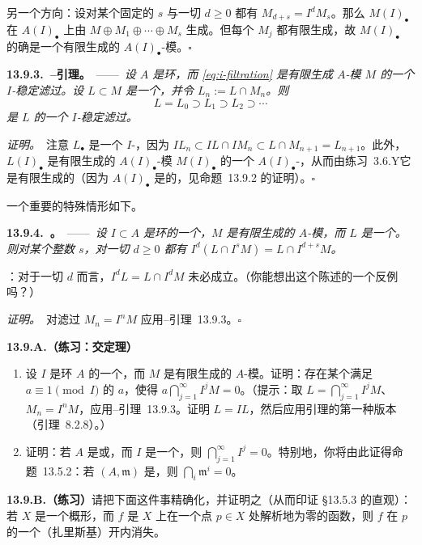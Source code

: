 另一个方向：设对某个固定的 $s$ 与一切 $d\ge0$ 都有 $M_{d+s}=I^dM_s$。那么 $M(I)_\bullet$ 在 $A(I)_\bullet$ 上由 $M\oplus M_1\oplus\cdots\oplus M_s$ 生成。但每个 $M_j$ 都有限生成，故 $M(I)_\bullet$ 的确是一个有限生成的 $A(I)_\bullet$-模。\hfill$\square$

\textbf{13.9.3.\ \trArtin--\trRees{}引理。}\ ——\ \emph{设 $A$ 是\trNoetherian{}环，而 \eqref{eq:i-filtration} 是有限生成 $A$-模 $M$ 的一个 $I$-稳定滤过。设 $L\subset M$ 是一个\trSubmodule，并令 $L_n:=L\cap M_n$。则}
\[
L=L_0\supset L_1\supset L_2\supset\cdots
\]
\emph{是 $L$ 的一个 $I$-稳定滤过。}

\emph{证明。}\ 注意 $L_\bullet$ 是一个 $I$-\trFiltration，因为 $IL_n\subset IL\cap IM_n\subset L\cap M_{n+1}=L_{n+1}$。此外，$L(I)_\bullet$ 是有限生成的 $A(I)_\bullet$-模 $M(I)_\bullet$ 的一个 $A(I)_\bullet$-\trSubmodule，从而由\mbox{练习~3.6.Y}它是有限生成的（因为 $A(I)_\bullet$ 是\trNoetherian{}的，见命题~13.9.2 的证明）。\hfill$\square$

一个重要的特殊情形如下。

\textbf{13.9.4.\ \trhCorollary{}。}\ ——\ \emph{设 $I\subset A$ 是\trNoetherian{}环的一个\trIdeal，$M$ 是有限生成的 $A$-模，而 $L$ 是一个\trSubmodule。则对某个整数 $s$，对一切 $d\ge0$ 都有 $I^d(L\cap I^sM)=L\cap I^{d+s}M$。}

\trhWarning{}：对于一切 $d$ 而言，$I^dL=L\cap I^dM$ 未必成立。（你能想出这个陈述的一个反例吗？）

\emph{证明。}\ 对滤过 $M_n=I^nM$ 应用\trArtin--\trRees{}引理~13.9.3。\hfill$\square$

\textbf{13.9.A.（练习：\trKrull{}交定理）}\quad
\begin{enumerate}[label=(\alph*)]
\item 设 $I$ 是\trNoetherian{}环 $A$ 的一个\trIdeal，而 $M$ 是有限生成的 $A$-模。证明：存在某个满足 $a\equiv1\pmod{I}$ 的 $a$，使得 $a\bigcap_{j=1}^{\infty}I^jM=0$。（提示：取 $L=\bigcap_{j=1}^{\infty}I^jM$、$M_n=I^nM$，应用\trArtin--\trRees{}引理~13.9.3。证明 $L=IL$，然后应用\trNakayama{}引理的第一种版本（引理~8.2.8）。）
\item 证明：若 $A$ 是\trNoetherian\trIntegralDomain{}或\trNoetherian\trLocalRing，而 $I$ 是一个\trProperIdeal，则 $\bigcap_{j=1}^{\infty}I^j=0$。特别地，你将由此证得命题~13.5.2：若 $(A,\mathfrak{m})$ 是\trNoetherian\trLocalRing，则 $\bigcap_i\mathfrak{m}^i=0$。
\end{enumerate}

\textbf{13.9.B.（练习）}\quad 请把下面这件事精确化，并证明之（从而印证 \S13.5.3 的直观）：若 $X$ 是一个\trLocally\trNoetherian{}概形，而 $f$ 是 $X$ 上在一个点 $p\in X$ 处解析地为零的函数，则 $f$ 在 $p$ 的一个（扎里斯基）开\trNeighborhood{}内消失。

